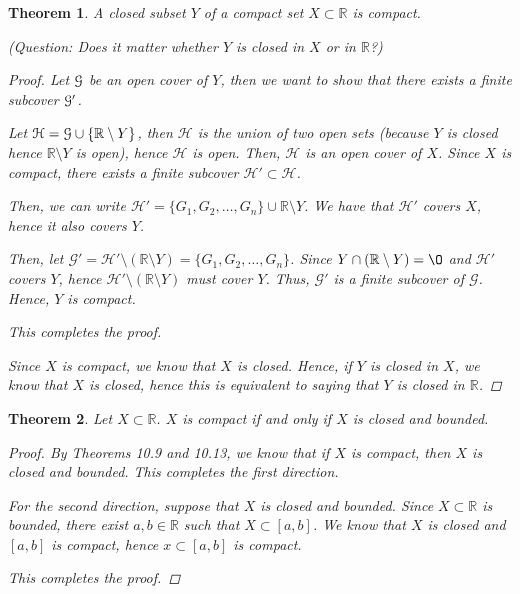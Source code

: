 \documentclass[11pt]{article}
\newcommand{\bbR}{\mathbb{R}}
\renewcommand{\emptyset}{\O}
\renewcommand{\_}[1]{\underline{ #1 }}
\newtheorem{theorem}{Theorem}[section]
\theoremstyle{definition}
\numberwithin{equation}{subsection}
\begin{document}
\begin{theorem}
A closed subset $Y$ of a compact set $X \subset \bbR$ is compact.

{\em (Question: Does it matter whether $Y$ is closed in $X$ or in $\bbR$?)}

\begin{proof}
Let $\mathcal G$ be an open cover of $Y$, then we want to show that there exists a finite subcover $\mathcal G'$. 

Let $\mathcal{H} = \cG \cup \{\bbR \setminus Y\}$, then $\mathcal{H}$ is the union of two open sets (because $Y$ is closed hence $\bbR \setminus Y$ is open), hence $\mathcal{H}$ is open. Then, $\mathcal{H}$ is an open cover of $X$. Since $X$ is compact, there exists a finite subcover $\mathcal{H'} \subset \mathcal{H}$. 

Then, we can write $\mathcal{H'}=\{G_1, G_2, \dots, G_n\} \cup \bbR \setminus Y$. We have that $\mathcal{H'}$ covers $X$, hence it also covers $Y$. 

Then, let $\mathcal{G'}=\mathcal{H'} \setminus (\bbR \setminus Y) = \{G_1, G_2, \dots, G_n\}$. Since $Y \cap (\bbR \setminus Y) = \emptyset$ and $\mathcal{H'}$ covers $Y$, hence $\mathcal{H'}\setminus (\bbR \setminus Y)$ must cover $Y$. Thus, $\mathcal{G'}$ is a finite subcover of $\mathcal{G}$. Hence, $Y$ is compact.

This completes the proof.

Since $X$ is compact, we know that $X$ is closed. Hence, if $Y$ is closed in $X$, we know that $X$ is closed, hence this is equivalent to saying that $Y$ is closed in $\bbR$. 

\renewcommand\qedsymbol{QED}
\end{proof}


\end{theorem}

\begin{theorem}\label{HB} Let $X \subset \bbR$.  $X$ is compact if and only if $X$ is closed and bounded.

\begin{proof}
By Theorems 10.9 and 10.13, we know that if $X$ is compact, then $X$ is closed and bounded. This completes the first direction.

For the second direction, suppose that $X$ is closed and bounded. Since $X \subset \bbR$ is bounded, there exist $a,b \in \bbR$ such that $X \subset [a,b]$. We know that $X$ is closed and $[a,b]$ is compact, hence $x \subset [a,b]$ is compact.

This completes the proof.

\renewcommand\qedsymbol{QED}
\end{proof}


\end{theorem}
\end{document}

